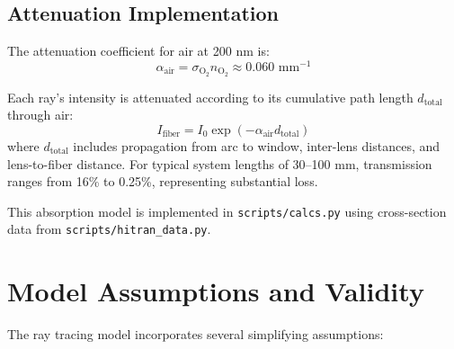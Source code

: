 \subsection{Attenuation Implementation}

The attenuation coefficient for air at 200 nm is:
\begin{equation}
\alpha_{\text{air}} = \sigma_{\text{O}_2} n_{\text{O}_2} \approx 0.060 \text{ mm}^{-1}
\end{equation}

Each ray's intensity is attenuated according to its cumulative path length $d_{\text{total}}$ through air:
\begin{equation}
I_{\text{fiber}} = I_0 \exp(-\alpha_{\text{air}} d_{\text{total}})
\end{equation}
where $d_{\text{total}}$ includes propagation from arc to window, inter-lens distances, and lens-to-fiber distance. For typical system lengths of 30--100 mm, transmission ranges from 16\% to 0.25\%, representing substantial loss.

This absorption model is implemented in \texttt{scripts/calcs.py} using cross-section data from \texttt{scripts/hitran\_data.py}.

\section{Model Assumptions and Validity}

The ray tracing model incorporates several simplifying assumptions:

